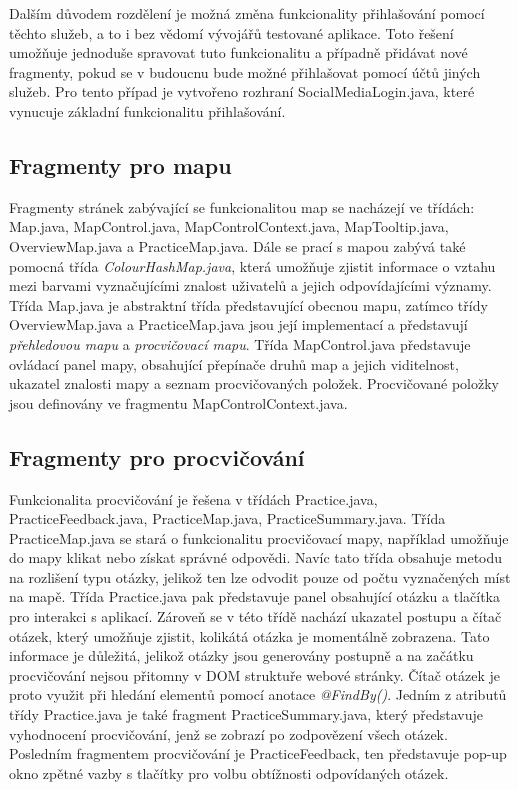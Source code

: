\documentclass[
    color,   %
	table,   %
    twoside, %
]{fithesis3}
\begin{document}
Dalším důvodem rozdělení je možná změna funkcionality přihlašování pomocí těchto služeb, a to i bez vědomí vývojářů testované aplikace. Toto řešení umožňuje jednoduše spravovat tuto funkcionalitu a případně přidávat nové fragmenty, pokud se v budoucnu bude možné přihlašovat pomocí účtů jiných služeb. Pro tento případ je vytvořeno rozhraní SocialMediaLogin.java, které vynucuje základní funkcionalitu přihlašování.

\subsection*{Fragmenty pro mapu}
Fragmenty stránek zabývající se funkcionalitou map se nacházejí ve třídách: Map.java, MapControl.java, MapControlContext.java, MapTooltip.java, OverviewMap.java a PracticeMap.java. Dále se prací s mapou zabývá také pomocná třída \emph{ColourHashMap.java}, která umožňuje zjistit informace o vztahu mezi barvami vyznačujícími znalost uživatelů a jejich odpovídajícími významy. Třída Map.java je abstraktní třída představující obecnou mapu, zatímco třídy OverviewMap.java a PracticeMap.java jsou její implementací a představují \emph{přehledovou mapu} a \emph{procvičovací mapu}. Třída MapControl.java představuje ovládací panel mapy, obsahující přepínače druhů map a jejich viditelnost, ukazatel znalosti mapy a seznam procvičovaných položek. Procvičované položky jsou definovány ve fragmentu MapControlContext.java.

\subsection*{Fragmenty pro procvičování}
Funkcionalita procvičování je řešena v třídách Practice.java, PracticeFeedback.java, PracticeMap.java, PracticeSummary.java. Třída PracticeMap.java se stará o funkcionalitu procvičovací mapy, například umožňuje do mapy klikat nebo získat správné odpovědi. Navíc tato třída obsahuje metodu na rozlišení typu otázky, jelikož ten lze odvodit pouze od počtu vyznačených míst na mapě. Třída Practice.java pak představuje panel obsahující otázku a tlačítka pro interakci s aplikací. Zároveň se v této třídě nachází ukazatel postupu a čítač otázek, který umožňuje zjistit, kolikátá otázka je momentálně zobrazena. Tato informace je důležitá, jelikož otázky jsou generovány postupně a na začátku procvičování nejsou přitomny v DOM struktuře webové stránky. Čítač otázek je proto využit při hledání elementů pomocí anotace \emph{@FindBy()}. Jedním z atributů třídy Practice.java je také fragment PracticeSummary.java, který představuje vyhodnocení procvičování, jenž se zobrazí po zodpovězení všech otázek. Posledním fragmentem procvičování je PracticeFeedback, ten představuje pop-up okno zpětné vazby s tlačítky pro volbu obtížnosti odpovídaných otázek.
\end{document}
